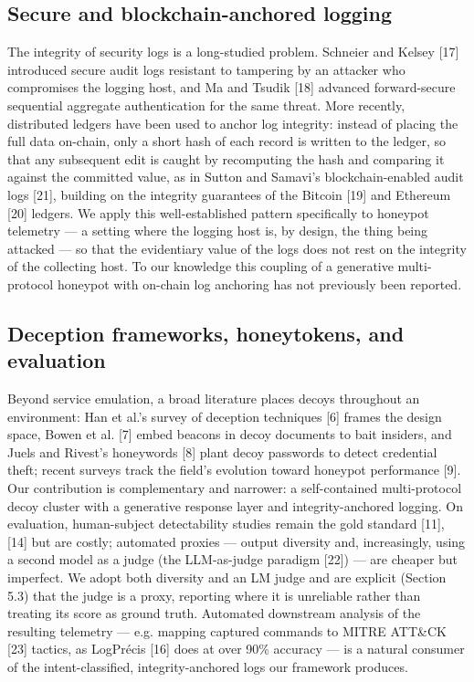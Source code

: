 \documentclass[conference]{IEEEtran}
\begin{document}
\subsection{Secure and blockchain-anchored logging}

The integrity of security logs is a long-studied problem. Schneier and Kelsey [17] introduced secure audit logs resistant to tampering by an attacker who compromises the logging host, and Ma and Tsudik [18] advanced forward-secure sequential aggregate authentication for the same threat. More recently, distributed ledgers have been used to anchor log integrity: instead of placing the full data on-chain, only a short hash of each record is written to the ledger, so that any subsequent edit is caught by recomputing the hash and comparing it against the committed value, as in Sutton and Samavi's blockchain-enabled audit logs [21], building on the integrity guarantees of the Bitcoin [19] and Ethereum [20] ledgers. We apply this well-established pattern specifically to honeypot telemetry --- a setting where the logging host is, by design, the thing being attacked --- so that the evidentiary value of the logs does not rest on the integrity of the collecting host. To our knowledge this coupling of a generative multi-protocol honeypot with on-chain log anchoring has not previously been reported.

\subsection{Deception frameworks, honeytokens, and evaluation}

Beyond service emulation, a broad literature places decoys throughout an environment: Han et al.'s survey of deception techniques [6] frames the design space, Bowen et al. [7] embed beacons in decoy documents to bait insiders, and Juels and Rivest's honeywords [8] plant decoy passwords to detect credential theft; recent surveys track the field's evolution toward honeypot performance [9]. Our contribution is complementary and narrower: a self-contained multi-protocol decoy cluster with a generative response layer and integrity-anchored logging. On evaluation, human-subject detectability studies remain the gold standard [11], [14] but are costly; automated proxies --- output diversity and, increasingly, using a second model as a judge (the LLM-as-judge paradigm [22]) --- are cheaper but imperfect. We adopt both diversity and an LM judge and are explicit (Section 5.3) that the judge is a proxy, reporting where it is unreliable rather than treating its score as ground truth. Automated downstream analysis of the resulting telemetry --- e.g. mapping captured commands to MITRE ATT\&CK [23] tactics, as LogPrécis [16] does at over 90\% accuracy --- is a natural consumer of the intent-classified, integrity-anchored logs our framework produces.
\end{document}
